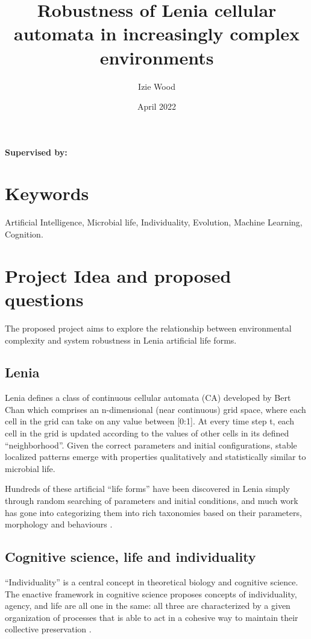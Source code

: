 \documentclass{article}
\title{Robustness of Lenia cellular automata in increasingly complex environments}
\author{Izie Wood}
\date{April 2022}
\begin{document}
\linespread{1.25}
\maketitle
\centering\textbf{Supervised by:}

\vspace{0.5cm}

\centering{}

\vspace{0.5cm}

\centering{}

\newpage

\textbf{}

\section{Keywords}
Artificial Intelligence, Microbial life, Individuality, Evolution, Machine Learning, Cognition. 

\section{Project Idea and proposed questions}
The proposed project aims to explore the relationship between environmental complexity and system robustness in Lenia artificial life forms. 

    \subsection{Lenia}
    Lenia defines a class of continuous cellular automata (CA) developed by Bert Chan which comprises an n-dimensional (near continuous) grid space, where each cell in the grid can take on any value between [0:1]. At every time step t, each cell in the grid is updated according to the values of other cells in its defined “neighborhood”. Given the correct parameters and initial configurations, stable localized patterns emerge with properties qualitatively and statistically similar to microbial life. 

Hundreds of these artificial “life forms” have been discovered in Lenia simply through random searching of parameters and initial conditions, and much work has gone into categorizing them into rich taxonomies based on their parameters, morphology and behaviours \cite{chan2018lenia}.
    
    \subsection{Cognitive science, life and individuality}
    “Individuality” is a central concept in theoretical biology and cognitive science.  The enactive framework in cognitive science proposes concepts of individuality,  agency, and life are all one in the same: all three are characterized by a given organization of processes that is able to act in a cohesive way to maintain their collective preservation \cite{varela2017embodied}.
\end{document}
